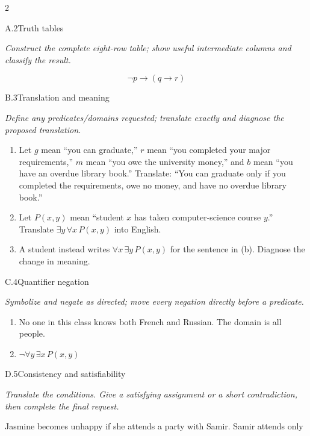\documentclass[9pt]{extarticle}
\begin{document}
\CoreWorkArea
\FormBreak
{}
\begin{multicols}{2}
\begin{CoreProblem}{A.2}{Truth tables}
{\scriptsize\textit{Construct the complete eight-row table; show useful intermediate columns and classify the result.}\par}
\[
  \neg p\to(q\to r)
\]
\end{CoreProblem}
\begin{CoreProblem}{B.3}{Translation and meaning}
{\scriptsize\textit{Define any predicates/domains requested; translate exactly and diagnose the proposed translation.}\par}
\begin{enumerate}[label=(\alph*)]
  \item Let $g$ mean ``you can graduate,'' $r$ mean ``you completed your major
        requirements,'' $m$ mean ``you owe the university money,'' and $b$
        mean ``you have an overdue library book.'' Translate: ``You can
        graduate only if you completed the requirements, owe no money, and
        have no overdue library book.''
  \item Let $P(x,y)$ mean ``student $x$ has taken computer-science course
        $y$.'' Translate $\exists y\,\forall x\,P(x,y)$ into English.
  \item A student instead writes $\forall x\,\exists y\,P(x,y)$ for the
        sentence in (b). Diagnose the change in meaning.
\end{enumerate}
\end{CoreProblem}
\begin{CoreProblem}{C.4}{Quantifier negation}
{\scriptsize\textit{Symbolize and negate as directed; move every negation directly before a predicate.}\par}
\begin{enumerate}[label=(\alph*)]
  \item No one in this class knows both French and Russian. The domain is all
        people.
  \item $\neg\forall y\,\exists x\,P(x,y)$
\end{enumerate}
\end{CoreProblem}
\columnbreak
\begin{CoreProblem}{D.5}{Consistency and satisfiability}
{\scriptsize\textit{Translate the conditions. Give a satisfying assignment or a short contradiction, then complete the final request.}\par}
Jasmine becomes unhappy if she attends a party with Samir. Samir attends only

\end{CoreProblem}
\end{multicols}
\end{document}
